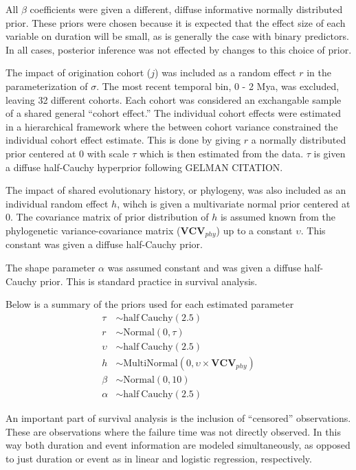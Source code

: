 \documentclass[12pt,letterpaper]{article}
\begin{document}
All \(\beta\) coefficients were given a different, diffuse informative normally distributed prior. These priors were chosen because it is expected that the effect size of each variable on duration will be small, as is generally the case with binary predictors. In all cases, posterior inference was not effected by changes to this choice of prior.

The impact of origination cohort (\(j\)) was included as a random effect \(r\) in the parameterization of \(\sigma\). The most recent temporal bin, 0 - 2 Mya, was excluded, leaving 32 different cohorts. Each cohort was considered an exchangable sample of a shared general ``cohort effect.'' The individual cohort effects were estimated in a hierarchical framework where the between cohort variance constrained the individual cohort effect estimate. This is done by giving \(r\) a normally distributed prior centered at 0 with scale \(\tau\) which is then estimated from the data. \(\tau\) is given a diffuse half-Cauchy hyperprior following GELMAN CITATION.

The impact of shared evolutionary history, or phylogeny, was also included as an individual random effect \(h\), wihch is given a multivariate normal prior centered at 0. The covariance matrix of prior distribution of \(h\) is assumed known from the phylogenetic variance-covariance matrix (\(\mathbf{VCV}_{phy}\)) up to a constant \(\upsilon\). %
This constant was given a diffuse half-Cauchy prior.

The shape parameter \(\alpha\) was assumed constant and was given a diffuse half-Cauchy prior. This is standard practice in survival analysis.

Below is a summary of the priors used for each estimated parameter 
\begin{align*}
  \tau &\sim \mathrm{half\ Cauchy}(2.5) \\
  r &\sim \mathrm{Normal}(0, \tau) \\
  \upsilon &\sim \mathrm{half\ Cauchy}(2.5) \\
  h &\sim \mathrm{MultiNormal}(0, \upsilon \times \mathbf{VCV}_{phy}) \\
  \beta &\sim \mathrm{Normal}(0, 10) \\
  \alpha &\sim \mathrm{half\ Cauchy}(2.5)
\end{align*}


An important part of survival analysis is the inclusion of ``censored'' observations. These are observations where the failure time was not directly observed. In this way both duration and event information are modeled simultaneously, as opposed to just duration or event as in linear and logistic regression, respectively. 
\end{document}
